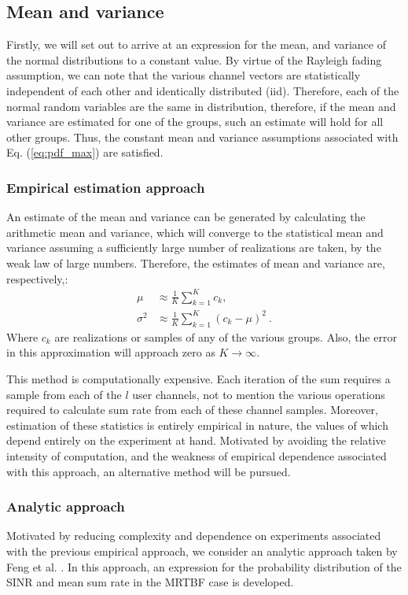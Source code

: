 \subsection{Mean and variance}
Firstly, we will set out to arrive at an expression for the mean, and variance of the normal distributions to a constant value. By virtue of the Rayleigh fading assumption, we can note that the various channel vectors are statistically independent of each other and identically distributed (iid). Therefore, each of the normal random variables are the same in distribution, therefore, if the mean and variance are estimated for one of the groups, such an estimate will hold for all other groups. Thus, the constant mean and variance assumptions associated with Eq. (\ref{eq:pdf_max}) are satisfied.

\subsubsection{Empirical estimation approach}
An estimate of the mean and variance can be generated by calculating the arithmetic mean and variance, which will converge to the statistical mean and variance assuming a sufficiently large number of realizations are taken, by the weak law of large numbers. Therefore, the estimates of mean and variance are, respectively,:
\begin{equation}\label{eq:arith_mean_var}
    \begin{aligned}
        \mu &\approx \frac{1}{K}\sum_{k=1}^{K}c_k,\\
        \sigma^2 &\approx \frac{1}{K}\sum_{k=1}^{K}(c_k-\mu)^2 \ .
    \end{aligned}
\end{equation}
Where $c_k$ are realizations or samples of any of the various groups. Also, the error in this approximation will approach zero as $K\rightarrow\infty$.

This method is computationally expensive. Each iteration of the sum requires a sample from each of the $l$ user channels, not to mention the various operations required to calculate sum rate from each of these channel samples. Moreover, estimation of these statistics is entirely empirical in nature, the values of which depend entirely on the experiment at hand. Motivated by avoiding the relative intensity of computation, and the weakness of empirical dependence associated with this approach, an alternative method will be pursued.

\subsubsection{Analytic approach}
Motivated by reducing complexity and dependence on experiments associated with the previous empirical approach, we consider an analytic approach taken by Feng et al. \cite{Feng2014}. In this approach, an expression for the probability distribution of the SINR and mean sum rate in the MRTBF case is developed.


